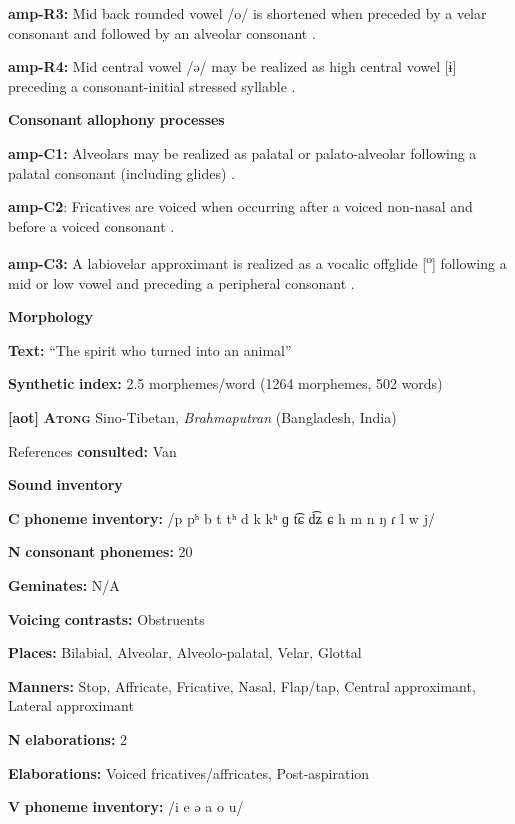 \begin{styleBody}
\textbf{amp-R3:} Mid back rounded vowel /o/ is shortened when preceded by a velar consonant and followed by an alveolar consonant \citep[39]{Bruce1984}.

\textbf{amp-R4:} Mid central vowel /ə/ may be realized as high central vowel [ɨ] preceding a consonant-initial stressed syllable \citep[41]{Bruce1984}.

\textbf{Consonant} \textbf{allophony} \textbf{processes}

\textbf{amp-C1:} Alveolars may be realized as palatal or palato-alveolar following a palatal consonant (including glides) \citep[29]{Bruce1984}.

\textbf{amp-C2}: Fricatives are voiced when occurring after a voiced non-nasal and before a voiced consonant \citep[25]{Bruce1984}.

\textbf{amp-C3:} A labiovelar approximant is realized as a vocalic offglide [\textsuperscript{o}] following a mid or low vowel and preceding a peripheral consonant \citep[28]{Bruce1984}.

\textbf{Morphology}

\textbf{Text:} “The spirit who turned into an animal” \citep[323-331]{Bruce1984}

\textbf{Synthetic} \textbf{index:} 2.5 morphemes/word (1264 morphemes, 502 words)

\textbf{[aot]}   \textbf{\textsc{Atong}  }  Sino-Tibetan, \textit{Brahmaputran} (Bangladesh, India)

References \textbf{consulted:} Van \citet{Breugel2008}

\textbf{Sound} \textbf{inventory}

\textbf{C} \textbf{phoneme} \textbf{inventory:} /p pʰ b t tʰ d k kʰ ɡ t͡ɕ d͡ʑ ɕ h m n ŋ ɾ l w j/

\textbf{N} \textbf{consonant} \textbf{phonemes:} 20

\textbf{Geminates:} N/A

\textbf{Voicing} \textbf{contrasts:} Obstruents

\textbf{Places:} Bilabial, Alveolar, Alveolo-palatal, Velar, Glottal

\textbf{Manners:} Stop, Affricate, Fricative, Nasal, Flap/tap, Central approximant, Lateral approximant

\textbf{N} \textbf{elaborations:} 2

\textbf{Elaborations:} Voiced fricatives/affricates, Post-aspiration

\textbf{V} \textbf{phoneme} \textbf{inventory:} /i e ə a o u/


\end{styleBody}
